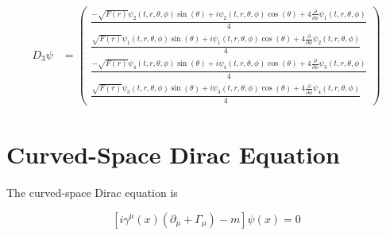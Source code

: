 \documentclass[12pt,fleqn]{article}
\begin{document}
\[
\begin{aligned}
D_{3}\psi &=
\begin{pmatrix}
\frac{- \sqrt{F{\left(r \right)}} \psi_{2}{\left(t,r,\theta,\phi \right)} \sin{\left(\theta \right)} + i \psi_{2}{\left(t,r,\theta,\phi \right)} \cos{\left(\theta \right)} + 4 \frac{\partial}{\partial \phi} \psi_{1}{\left(t,r,\theta,\phi \right)}}{4} \\
\frac{\sqrt{F{\left(r \right)}} \psi_{1}{\left(t,r,\theta,\phi \right)} \sin{\left(\theta \right)} + i \psi_{1}{\left(t,r,\theta,\phi \right)} \cos{\left(\theta \right)} + 4 \frac{\partial}{\partial \phi} \psi_{2}{\left(t,r,\theta,\phi \right)}}{4} \\
\frac{- \sqrt{F{\left(r \right)}} \psi_{4}{\left(t,r,\theta,\phi \right)} \sin{\left(\theta \right)} + i \psi_{4}{\left(t,r,\theta,\phi \right)} \cos{\left(\theta \right)} + 4 \frac{\partial}{\partial \phi} \psi_{3}{\left(t,r,\theta,\phi \right)}}{4} \\
\frac{\sqrt{F{\left(r \right)}} \psi_{3}{\left(t,r,\theta,\phi \right)} \sin{\left(\theta \right)} + i \psi_{3}{\left(t,r,\theta,\phi \right)} \cos{\left(\theta \right)} + 4 \frac{\partial}{\partial \phi} \psi_{4}{\left(t,r,\theta,\phi \right)}}{4}
\end{pmatrix}
\end{aligned}
\]

\section*{Curved-Space Dirac Equation}

The curved-space Dirac equation is

\[
\boxed{
\left[
i\gamma^\mu(x)
\left(
\partial_\mu+\Gamma_\mu
\right)
-m
\right]
\psi(x)
=
0
}
\]
\end{document}
